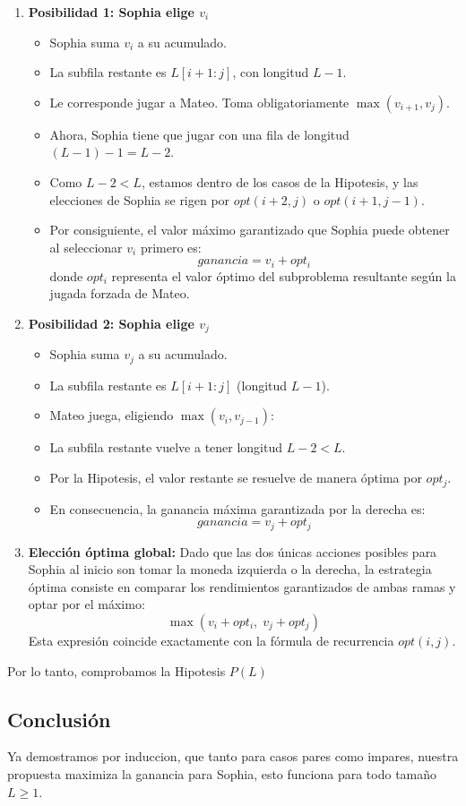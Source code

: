 \begin{enumerate}
    \item \textbf{Posibilidad 1: Sophia elige $v_i$}
    \begin{itemize}
        \item Sophia suma $v_i$ a su acumulado.
        \item La subfila restante es $L[i+1: j]$, con longitud $L - 1$.
        \item Le corresponde jugar a Mateo. Toma obligatoriamente $\max(v_{i+1}, v_j)$.
        \item Ahora, Sophia tiene que jugar con una fila de longitud $(L - 1) - 1 = L - 2$.
        \item Como $L - 2 < L$, estamos dentro de los casos de la Hipotesis, y las elecciones de Sophia se rigen por $opt(i+2, j)$ o $opt(i+1, j-1)$.
        \item Por consiguiente, el valor máximo garantizado que Sophia puede obtener al seleccionar $v_i$ primero es:
        $$ ganancia = v_i + opt_i$$
        donde $opt_i$ representa el valor óptimo del subproblema resultante según la jugada forzada de Mateo.
    \end{itemize}

    \item \textbf{Posibilidad 2: Sophia elige $v_j$}
    \begin{itemize}
        \item Sophia suma $v_j$ a su acumulado.
        \item La subfila restante es $L[i+1: j]$ (longitud $L - 1$).
        \item Mateo juega, eligiendo $\max(v_i, v_{j-1})$:
        \item La subfila restante vuelve a tener longitud $L - 2 < L$.
        \item Por la Hipotesis, el valor restante se resuelve de manera óptima por $opt_j$.
        \item En consecuencia, la ganancia máxima garantizada por la derecha es:
        $$ganancia = v_j + opt_j$$
    \end{itemize}

    \item \textbf{Elección óptima global:}
    Dado que las dos únicas acciones posibles para Sophia al inicio son tomar la moneda izquierda o la derecha, la estrategia óptima consiste en comparar los rendimientos garantizados de ambas ramas y optar por el máximo:
    $$\max(v_i + opt_i, \; v_j + opt_j)$$
    Esta expresión coincide exactamente con la fórmula de recurrencia $opt(i, j)$.
\end{enumerate}
Por lo tanto, comprobamos la Hipotesis $P(L)$ 

\subsection{Conclusión}
Ya demostramos por induccion, que tanto para casos pares como impares, nuestra propuesta maximiza la ganancia para Sophia, esto funciona para todo tamaño $L \ge 1$.
\newpage